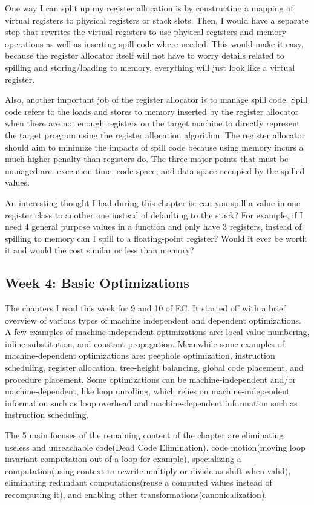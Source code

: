 \documentclass[11pt, a4paper, titlepage]{article}
\begin{document}
One way I can split up my register allocation is by constructing a mapping of virtual registers to physical registers or stack slots. Then, I would have a separate step that rewrites the virtual registers to use physical registers and memory operations as well as inserting spill code where needed. This would make it easy, because the register allocator itself will not have to worry details related to spilling and storing/loading to memory, everything will just look like a virtual register.

Also, another important job of the register allocator is to manage spill code. Spill code refers to the  loads and stores to memory inserted by the register allocator when there are not enough registers on the target machine to directly represent the target program using the register allocation algorithm. The register allocator should aim to minimize the impacts of spill code because using memory incurs a much higher penalty than registers do. The three major points that must be managed are: execution time, code space, and data space occupied by the spilled values.

An interesting thought I had during this chapter is: can you spill a value in one register class to another one instead of defaulting to the stack? For example, if I need 4 general purpose values in a function and only have 3 registers, instead of spilling to memory can I spill to a floating-point register? Would it ever be worth it and would the cost similar or less than memory?

\subsection{Week 4: Basic Optimizations}

The chapters I read this week for 9 and 10 of EC.
It started off with a brief overview of various types of machine independent and dependent optimizations.
A few examples of machine-independent optimizations are:
local value numbering, inline substitution, and constant propagation.
Meanwhile some examples of machine-dependent optimizations are:
peephole optimization, instruction scheduling, register allocation, tree-height balancing, global code placement, and procedure placement.
Some optimizations can be machine-independent and/or machine-dependent,
like loop unrolling, which relies on machine-independent information such as loop overhead and machine-dependent information such as instruction scheduling.

The 5 main focuses of the remaining content of the chapter are eliminating useless and unreachable code(Dead Code Elimination), code motion(moving loop invariant computation out of a loop for example), specializing a computation(using context to rewrite multiply or divide as shift when valid), eliminating redundant computations(reuse a computed values instead of recomputing it), and enabling other transformations(canonicalization).
\end{document}
